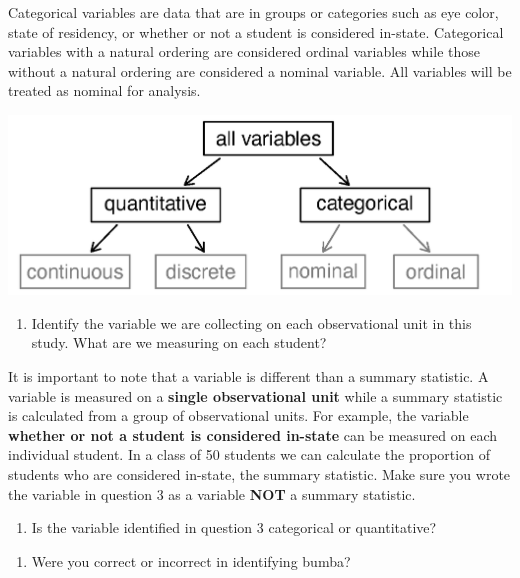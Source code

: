 \documentclass[
]{report}
\providecommand{\tightlist}{%
  \setlength{\itemsep}{0pt}\setlength{\parskip}{0pt}}
\begin{document}
Categorical variables are data that are in groups or categories such as eye color, state of residency, or whether or not a student is considered in-state. Categorical variables with a natural ordering are considered ordinal variables while those without a natural ordering are considered a nominal variable. All variables will be treated as nominal for analysis.

\includegraphics{images/variables.png}

\begin{enumerate}
\def\labelenumi{\arabic{enumi}.}
\setcounter{enumi}{2}
\tightlist
\item
  Identify the variable we are collecting on each observational unit in this study. What are we measuring on each student?
\end{enumerate}

\vspace{1in}

It is important to note that a variable is different than a summary statistic. A variable is measured on a \textbf{single observational unit} while a summary statistic is calculated from a group of observational units. For example, the variable \textbf{whether or not a student is considered in-state} can be measured on each individual student. In a class of 50 students we can calculate the proportion of students who are considered in-state, the summary statistic. Make sure you wrote the variable in question 3 as a variable \textbf{NOT} a summary statistic.

\begin{enumerate}
\def\labelenumi{\arabic{enumi}.}
\setcounter{enumi}{3}
\tightlist
\item
  Is the variable identified in question 3 categorical or quantitative?
\end{enumerate}

\vspace{0.5in}

\begin{enumerate}
\def\labelenumi{\arabic{enumi}.}
\setcounter{enumi}{4}
\tightlist
\item
  Were you correct or incorrect in identifying bumba?
\end{enumerate}
\end{document}
